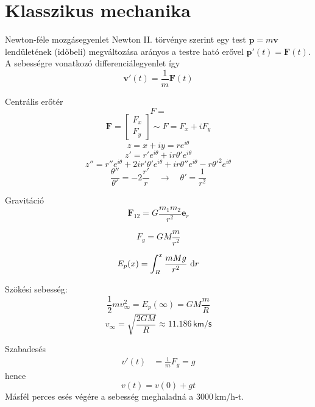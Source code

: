 \documentclass[10pt]{beamer}
\newcommand{\bp}[0]{\mathbf{p}}
\newcommand{\be}[0]{\mathbf{e}}
\newcommand{\bv}[0]{\mathbf{v}}
\newcommand{\bF}[0]{\mathbf{F}}
\begin{document}
\section{Klasszikus mechanika}
\begin{frame}[t]{Newton-féle mozgásegyenlet}
Newton II. törvénye szerint egy test $\bp=m\bv$ lendületének (időbeli) megváltozása
arányos a testre ható erővel $\bp'(t) = \bF(t).$
A sebességre vonatkozó differenciálegyenlet így
\[\bv'(t) = \frac{1}{m}\bF(t)\]
\end{frame}

\begin{frame}[t]{Centrális erőtér}
\[F = \]
\[\bF = \begin{bmatrix}
         F_x\\ F_y
        \end{bmatrix}
        \sim 
        F = F_x + i F_y
\]
\[z = x + iy = r e^{i \theta}\]
\[z' = r' e^{i \theta} + i r \theta' e^{i \theta}\]
\[z'' = r'' e^{i \theta} + 2 i r' \theta' e^{i \theta} + i r \theta'' e^{i \theta} - r \theta'^2 e^{i\theta}\]
\[\frac{\theta''}{\theta'} = -2\frac{r'}{r}\quad  \to \quad \theta' = \frac{1}{r^2}\]

\end{frame}


\begin{frame}[t]{Gravitáció}
\[
\bF_{12} = G \frac{m_1 m_2}{r^2}\be_r
\]

\[F_g = GM \frac{m}{r^2}\]

\[E_p(x) = \int_{R}^x \frac{mMg}{r^2}\, \dif r\]

Szökési sebesség:
\[\frac{1}{2}m v_{\infty}^2 = E_p(\infty) = GM\frac{m}{R}\]
\[v_\infty = \sqrt{\frac{2 GM}{R}}\approx 11.186\, \mathsf{km/s}\]

\end{frame}

\begin{frame}[t]{Szabadesés}
\[
\begin{split}
v'(t)   &= \frac{1}{m}F_g = g
\end{split}
\]
hence
\[v(t) = v(0) + g t\]
Másfél perces esés végére a sebesség meghaladná a $3000\,$km/h-t.
\end{frame}
\end{document}
